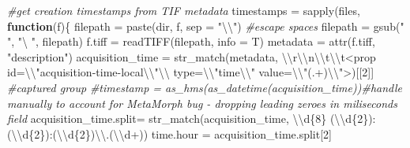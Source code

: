 \documentclass[
  12pt,
  a4paper,
]{book}
\newenvironment{Shaded}{}{}
\newcommand{\AttributeTok}[1]{\textcolor[rgb]{0.49,0.56,0.16}{#1}}
\newcommand{\CommentTok}[1]{\textcolor[rgb]{0.38,0.63,0.69}{\textit{#1}}}
\newcommand{\ControlFlowTok}[1]{\textcolor[rgb]{0.00,0.44,0.13}{\textbf{#1}}}
\newcommand{\DecValTok}[1]{\textcolor[rgb]{0.25,0.63,0.44}{#1}}
\newcommand{\FunctionTok}[1]{\textcolor[rgb]{0.02,0.16,0.49}{#1}}
\newcommand{\NormalTok}[1]{#1}
\newcommand{\OtherTok}[1]{\textcolor[rgb]{0.00,0.44,0.13}{#1}}
\newcommand{\SpecialCharTok}[1]{\textcolor[rgb]{0.25,0.44,0.63}{#1}}
\newcommand{\StringTok}[1]{\textcolor[rgb]{0.25,0.44,0.63}{#1}}
\begin{document}
\begin{Shaded}
\begin{Highlighting}[]
\CommentTok{\#get creation timestamps from TIF metadata}
\NormalTok{timestamps }\OtherTok{=} \FunctionTok{sapply}\NormalTok{(files, }\ControlFlowTok{function}\NormalTok{(f)\{}
\NormalTok{    filepath }\OtherTok{=} \FunctionTok{paste}\NormalTok{(dir, f, }\AttributeTok{sep =} \StringTok{"}\SpecialCharTok{\textbackslash{}\textbackslash{}}\StringTok{"}\NormalTok{)}
    \CommentTok{\#escape spaces}
\NormalTok{    filepath }\OtherTok{=} \FunctionTok{gsub}\NormalTok{(}\StringTok{" "}\NormalTok{, }\StringTok{"\textbackslash{} "}\NormalTok{, filepath)}
\NormalTok{    f.tiff }\OtherTok{=} \FunctionTok{readTIFF}\NormalTok{(filepath, }\AttributeTok{info =}\NormalTok{ T)}
\NormalTok{    metadata }\OtherTok{=} \FunctionTok{attr}\NormalTok{(f.tiff, }\StringTok{"description"}\NormalTok{)}
\NormalTok{    acquisition\_time }\OtherTok{=} \FunctionTok{str\_match}\NormalTok{(metadata, }
                              \StringTok{\textquotesingle{}}\SpecialCharTok{\textbackslash{}\textbackslash{}}\StringTok{r}\SpecialCharTok{\textbackslash{}\textbackslash{}}\StringTok{n}\SpecialCharTok{\textbackslash{}\textbackslash{}}\StringTok{t}\SpecialCharTok{\textbackslash{}\textbackslash{}}\StringTok{t\textless{}prop id=}\SpecialCharTok{\textbackslash{}\textbackslash{}}\StringTok{"acquisition{-}time{-}local}\SpecialCharTok{\textbackslash{}\textbackslash{}}\StringTok{"}\SpecialCharTok{\textbackslash{}\textbackslash{}}\StringTok{ type=}\SpecialCharTok{\textbackslash{}\textbackslash{}}\StringTok{"time}\SpecialCharTok{\textbackslash{}\textbackslash{}}\StringTok{" value=}\SpecialCharTok{\textbackslash{}\textbackslash{}}\StringTok{"(.+)}\SpecialCharTok{\textbackslash{}\textbackslash{}}\StringTok{"\textgreater{}\textquotesingle{}}\NormalTok{)[[}\DecValTok{2}\NormalTok{]] }\CommentTok{\#captured group}
    \CommentTok{\#timestamp = as\_hms(as\_datetime(acquisition\_time))\#handle manually to account for MetaMorph bug {-} dropping leading zeroes in miliseconds field}
\NormalTok{    acquisition\_time.split}\OtherTok{=} \FunctionTok{str\_match}\NormalTok{(acquisition\_time, }\StringTok{\textquotesingle{}}\SpecialCharTok{\textbackslash{}\textbackslash{}}\StringTok{d\{8\} (}\SpecialCharTok{\textbackslash{}\textbackslash{}}\StringTok{d\{2\}):(}\SpecialCharTok{\textbackslash{}\textbackslash{}}\StringTok{d\{2\}):(}\SpecialCharTok{\textbackslash{}\textbackslash{}}\StringTok{d\{2\})}\SpecialCharTok{\textbackslash{}\textbackslash{}}\StringTok{.(}\SpecialCharTok{\textbackslash{}\textbackslash{}}\StringTok{d+)\textquotesingle{}}\NormalTok{)}
\NormalTok{    time.hour }\OtherTok{=}\NormalTok{ acquisition\_time.split[}\DecValTok{2}\NormalTok{]}

\end{Highlighting}
\end{Shaded}
\end{document}
